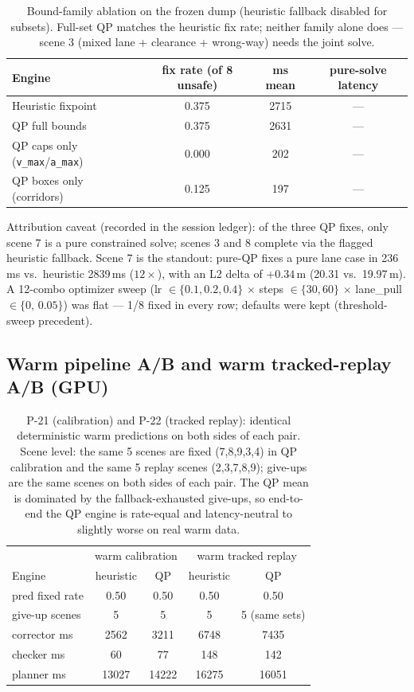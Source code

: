 \documentclass[11pt]{article}
\begin{document}
\begin{table}[h]
\centering\small
\begin{tabular}{lccc}
\toprule
Engine & fix rate (of 8 unsafe) & ms mean & pure-solve latency \\
\midrule
Heuristic fixpoint & 0.375 & 2715 & --- \\
QP full bounds & 0.375 & 2631 & --- \\
QP caps only (\texttt{v\_max}/\texttt{a\_max}) & 0.000 & 202 & --- \\
QP boxes only (corridors) & 0.125 & 197 & --- \\
\bottomrule
\end{tabular}
\caption{Bound-family ablation on the frozen dump (heuristic fallback
disabled for subsets). Full-set QP matches the heuristic fix rate;
neither family alone does --- scene 3 (mixed lane + clearance +
wrong-way) needs the joint solve.}
\label{tab:ablation}
\end{table}

Attribution caveat (recorded in the session ledger): of the three QP
fixes, only scene 7 is a pure constrained solve; scenes 3 and 8
complete via the flagged heuristic fallback. Scene 7 is the standout:
pure-QP fixes a pure lane case in 236\,ms vs.\ heuristic 2839\,ms
($12\times$), with an L2 delta of $+0.34$\,m (20.31 vs.\ 19.97\,m).
A 12-combo optimizer sweep (lr $\in\{0.1,0.2,0.4\}$ $\times$ steps
$\in\{30,60\}$ $\times$ lane\_pull $\in\{0,\,0.05\}$) was flat ---
1/8 fixed in every row; defaults were kept (threshold-sweep
precedent).

\subsection{Warm pipeline A/B and warm tracked-replay A/B (GPU)}

\begin{table}[h]
\centering\small
\begin{tabular}{lcc|cc}
\toprule
 & \multicolumn{2}{c|}{warm calibration} & \multicolumn{2}{c}{warm tracked replay} \\
Engine & heuristic & QP & heuristic & QP \\
\midrule
pred fixed rate & 0.50 & 0.50 & 0.50 & 0.50 \\
give-up scenes & 5 & 5 & 5 & 5 (same sets) \\
corrector ms & 2562 & 3211 & 6748 & 7435 \\
checker ms & 60 & 77 & 148 & 142 \\
planner ms & 13027 & 14222 & 16275 & 16051 \\
\bottomrule
\end{tabular}
\caption{P-21 (calibration) and P-22 (tracked replay): identical
deterministic warm predictions on both sides of each pair. Scene
level: the same 5 scenes are fixed (7,8,9,3,4) in QP calibration and
the same 5 replay scenes (2,3,7,8,9); give-ups are the same scenes
on both sides of each pair. The QP mean is dominated by the
fallback-exhausted give-ups, so end-to-end the QP engine is rate-equal
and latency-neutral to slightly worse on real warm data.}
\label{tab:warm}
\end{table}
\end{document}

